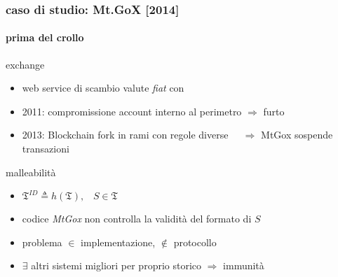 \begin{frame}
\frametitle{caso di studio: Mt.GoX [2014]}
\framesubtitle{prima del crollo}
	
	{\color{blue} exchange}
	\begin{itemize}
	  \item web service di scambio valute \textit{fiat} con \bitcoinA
	  \item 2011: compromissione account interno al perimetro $\Rightarrow$ furto \bitcoinA
	  \item 2013: Blockchain fork in rami con regole diverse 
	  \newline $\;\;\;\;\Rightarrow$ MtGox sospende transazioni
	\end{itemize}
	
	{\color{blue} malleabilità}
	\begin{itemize}
		\item $\mathfrak{T}^{ID}\triangleq h(\mathfrak{T}),\;\;\;S\in\mathfrak{T}$
	 	\item codice \textit{MtGox} non controlla la validità del formato di $S$
	 	\item problema $\in$ implementazione, $\mathbf{\notin}$ protocollo \bitcoinA
	 	\item $\exists$ altri sistemi migliori per proprio storico $\Rightarrow$ immunità
	\end{itemize}

\end{frame}

